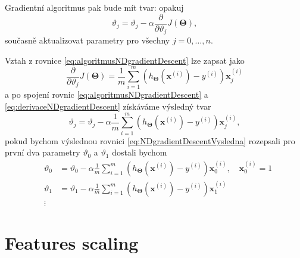 \par{Gradientní algoritmus pak bude mít tvar: opakuj
\begin{equation}
	\vartheta_j = \vartheta_j - \alpha \frac{\partial}{\partial \vartheta_j} J \left( \bm{\Theta} \right),
	\label{eq:algoritmusNDgradientDescent}
\end{equation}
současně aktualizovat parametry pro všechny $j = 0, \ldots, n$.}

\par{Vztah z rovnice \ref{eq:algoritmusNDgradientDescent} lze zapsat jako
\begin{equation}
	\frac{\partial}{\partial \vartheta_j} J \left( \bm{\Theta} \right) = \frac{1}{m} \sum_{i = 1}^{m} \left( h_{\bm{\Theta}} \left( \bm{x}^{\left( i \right)} \right) - y^{\left( i \right)} \right) \bm{x}^{\left( i \right)}_j
	\label{eq:derivaceNDgradientDescent}	
\end{equation}
a po spojení rovnic 	\ref{eq:algoritmusNDgradientDescent} a \ref{eq:derivaceNDgradientDescent} získáváme výsledný tvar
\begin{equation}
	\vartheta_j = \vartheta_j - \alpha \frac{1}{m} \sum_{i = 1}^{m} \left( h_{\bm{\Theta}} \left( \bm{x}^{\left( i \right)} \right) - y^{\left( i \right)} \right) \bm{x}^{\left( i \right)}_j,
	\label{eq:NDgradientDescentVysledna}
\end{equation}
pokud bychom výslednou rovnici \ref{eq:NDgradientDescentVysledna} rozepsali pro první dva parametry $\vartheta_0$ a $\vartheta_1$ dostali bychom
\begin{eqnarray}
	&\vartheta_0 &= \vartheta_0 - \alpha \frac{1}{m} \sum_{i = 1}^{m} \left( h_{\bm{\Theta}} \left( \bm{x}^{\left( i \right)} \right) - y^{\left( i \right)} \right) \bm{x}^{\left( i \right)}_0, \quad \bm{x}^{\left( i \right)}_0 = 1\\
	&\vartheta_1 &= \vartheta_1 - \alpha \frac{1}{m} \sum_{i = 1}^{m} \left( h_{\bm{\Theta}} \left( \bm{x}^{\left( i \right)} \right) - y^{\left( i \right)} \right) \bm{x}^{\left( i \right)}_1\\
	\nonumber
	&\vdots
\end{eqnarray}}


\newpage













\section{Features scaling}
\label{sec:featuresScaling}

